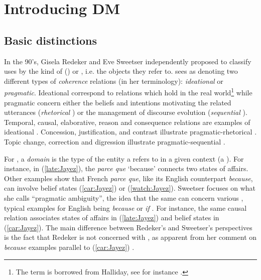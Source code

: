 \documentclass[output=paper,colorlinks,citecolor=brown]{langscibook}
\begin{document}
\section{Introducing DM}
\label{sec-dimensions:Jayez}

\subsection{Basic distinctions}
\label{sec-basic-distinctions:Jayez}


In the 90's, Gisela Redeker and Eve Sweetser independently proposed to classify  uses by the kind of  () or , i.e. the objects they refer to. \citet{Redeker:1990} sees  as denoting two different types of \textit{coherence} relations (in her terminology): \textit{ideational} or \textit{pragmatic}. Ideational  correspond to relations which hold in the real world\footnote{The term is borrowed from Halliday, see for instance \citep[84]{Halliday:2003}.} while pragmatic  concern either the beliefs and intentions motivating the related utterances (\textit{rhetorical} ) or the management of discourse evolution (\textit{sequential} ). Temporal, causal, elaborative, reason and consequence relations are examples of ideational . Concession, justification, and contrast illustrate pragmatic-rhetorical . Topic change, correction and digression illustrate pragmatic-sequential .

For \citet{Sweetser:1990}, a \textit{domain} is the type of the entity a  refers to in a given context (a ). For instance, in (\ref{late:Jayez}), the \textit{parce que} `because'  connects two states of affairs. Other examples show that French \textit{parce que}, like its English counterpart \textit{because}, can involve belief states (\ref{car:Jayez}) or  (\ref{watch:Jayez}). Sweetser focuses on what she calls ``pragmatic ambiguity'', the idea that the same  can concern various , typical examples for English being \textit{because} or \textit{if} \citep{Sweetser:1990,Dancygier:1998}. For instance, the same causal relation associates states of affairs in (\ref{late:Jayez}) and belief states in (\ref{car:Jayez}). The main difference between Redeker's and Sweetser's perspectives is the fact that Redeker is not concerned with , as apparent from her comment on \textit{because} examples parallel to (\ref{car:Jayez}) \citep[373]{Redeker:1990}.
\end{document}
